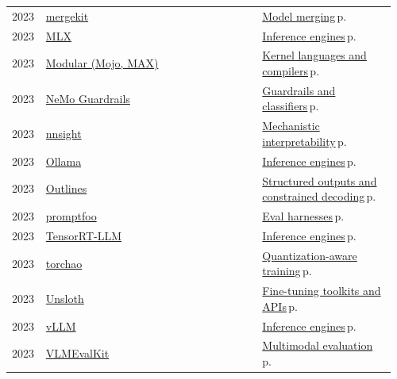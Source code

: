 \documentclass[10pt,a4paper,openany]{report}
\begin{document}
{\begin{longtable}{@{}p{0.07\linewidth}>{\raggedright}p{0.55\linewidth}>{\raggedright\arraybackslash}p{0.34\linewidth}@{}}
2023 & \href{https://github.com/arcee-ai/mergekit}{mergekit} & \hyperref[c:training-7]{Model merging}\,{\color{muted}\scriptsize p.\,\pageref{c:training-7}}\\
2023 & \href{https://github.com/ml-explore/mlx}{MLX} & \hyperref[c:inference-0]{Inference engines}\,{\color{muted}\scriptsize p.\,\pageref{c:inference-0}}\\
2023 & \href{https://github.com/modular/modular}{Modular (Mojo, MAX)} & \hyperref[c:hardware-13]{Kernel languages and compilers}\,{\color{muted}\scriptsize p.\,\pageref{c:hardware-13}}\\
2023 & \href{https://github.com/NVIDIA/NeMo-Guardrails}{NeMo Guardrails} & \hyperref[c:safety-5]{Guardrails and classifiers}\,{\color{muted}\scriptsize p.\,\pageref{c:safety-5}}\\
2023 & \href{https://github.com/ndif-team/nnsight}{nnsight} & \hyperref[c:safety-6]{Mechanistic interpretability}\,{\color{muted}\scriptsize p.\,\pageref{c:safety-6}}\\
2023 & \href{https://github.com/ollama/ollama}{Ollama} & \hyperref[c:inference-0]{Inference engines}\,{\color{muted}\scriptsize p.\,\pageref{c:inference-0}}\\
2023 & \href{https://github.com/dottxt-ai/outlines}{Outlines} & \hyperref[c:context-9]{Structured outputs and constrained decoding}\,{\color{muted}\scriptsize p.\,\pageref{c:context-9}}\\
2023 & \href{https://github.com/promptfoo/promptfoo}{promptfoo} & \hyperref[c:evals-0]{Eval harnesses}\,{\color{muted}\scriptsize p.\,\pageref{c:evals-0}}\\
2023 & \href{https://github.com/NVIDIA/TensorRT-LLM}{TensorRT-LLM} & \hyperref[c:inference-0]{Inference engines}\,{\color{muted}\scriptsize p.\,\pageref{c:inference-0}}\\
2023 & \href{https://github.com/pytorch/ao}{torchao} & \hyperref[c:quant-4]{Quantization-aware training}\,{\color{muted}\scriptsize p.\,\pageref{c:quant-4}}\\
2023 & \href{https://github.com/unslothai/unsloth}{Unsloth} & \hyperref[c:training-6]{Fine-tuning toolkits and APIs}\,{\color{muted}\scriptsize p.\,\pageref{c:training-6}}\\
2023 & \href{https://github.com/vllm-project/vllm}{vLLM} & \hyperref[c:inference-0]{Inference engines}\,{\color{muted}\scriptsize p.\,\pageref{c:inference-0}}\\
2023 & \href{https://github.com/open-compass/VLMEvalKit}{VLMEvalKit} & \hyperref[c:vlm-9]{Multimodal evaluation}\,{\color{muted}\scriptsize p.\,\pageref{c:vlm-9}}\\

\end{longtable}}
\end{document}

